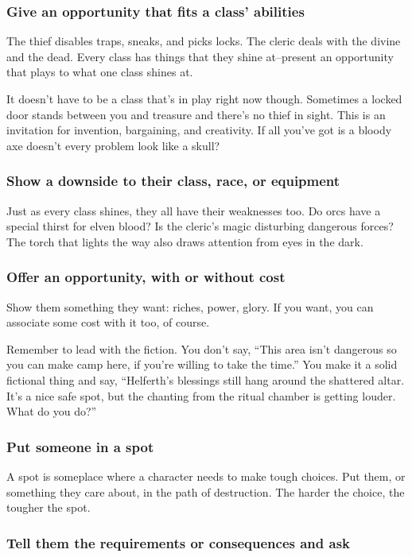 \subsubsection{Give an opportunity that fits a class' abilities}


 The thief disables traps, sneaks, and picks locks. The cleric deals with the divine and the dead. Every class has things that they shine at--present an opportunity that plays to what one class shines at.


 It doesn't have to be a class that's in play right now though. Sometimes a locked door stands between you and treasure and there's no thief in sight. This is an invitation for invention, bargaining, and creativity. If all you've got is a bloody axe doesn't every problem look like a skull?
\subsubsection{Show a downside to their class, race, or equipment}


 Just as every class shines, they all have their weaknesses too. Do orcs have a special thirst for elven blood? Is the cleric's magic disturbing dangerous forces? The torch that lights the way also draws attention from eyes in the dark.
\subsubsection{Offer an opportunity, with or without cost}


 Show them something they want: riches, power, glory. If you want, you can associate some cost with it too, of course.


 Remember to lead with the fiction. You don't say, ``This area isn't dangerous so you can make camp here, if you're willing to take the time.'' You make it a solid fictional thing and say, ``Helferth's blessings still hang around the shattered altar. It's a nice safe spot, but the chanting from the ritual chamber is getting louder. What do you do?''
\subsubsection{Put someone in a spot}


 A spot is someplace where a character needs to make tough choices. Put them, or something they care about, in the path of destruction. The harder the choice, the tougher the spot.
\subsubsection{Tell them the requirements or consequences and ask}


